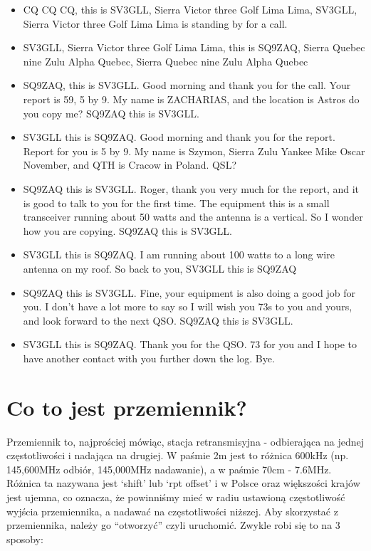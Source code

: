 \documentclass[a4paper,12pt]{article}
\begin{document}
\begin{itemize}
 \item CQ CQ CQ, this is SV3GLL, Sierra Victor three Golf Lima Lima, SV3GLL, Sierra Victor three Golf Lima Lima is standing by for a call.
 \item SV3GLL, Sierra Victor three Golf Lima Lima, this is SQ9ZAQ, Sierra Quebec nine Zulu Alpha Quebec, Sierra Quebec nine Zulu Alpha Quebec
 \item SQ9ZAQ, this is SV3GLL. Good morning and thank you for the call. Your report is 59, 5 by 9. My name is ZACHARIAS, and the location is Astros do you copy me? SQ9ZAQ this is SV3GLL.
 \item SV3GLL this is SQ9ZAQ. Good morning and thank you for the report. Report for you is 5 by 9. My name is Szymon, Sierra Zulu Yankee Mike Oscar November, and QTH is Cracow in Poland. QSL?
 \item SQ9ZAQ this is SV3GLL. Roger, thank you very much for the report, and it is good to talk to you for the first time. The equipment this is a small transceiver running about 50 watts and the antenna is a vertical. So I wonder how you are copying. SQ9ZAQ this is SV3GLL.
 \item SV3GLL this is SQ9ZAQ. I am running about 100 watts to a long wire antenna on my roof. So back to you, SV3GLL this is SQ9ZAQ
 \item SQ9ZAQ this is SV3GLL. Fine, your equipment is also doing a good job for you. I don't have a lot more to say so I will wish you 73s to you and yours, and look forward to the next QSO. SQ9ZAQ this is SV3GLL.
 \item SV3GLL this is SQ9ZAQ. Thank you for the QSO. 73 for you and I hope to have another contact with you further down the log. Bye.
\end{itemize}

\section{Co to jest przemiennik?}
Przemiennik to, najprościej mówiąc, stacja retransmisyjna - odbierająca na jednej częstotliwości i nadająca na drugiej. W paśmie 2m jest to różnica 600kHz (np. 145,600MHz odbiór, 145,000MHz nadawanie), a w paśmie 70cm - 7.6MHz. Różnica ta nazywana jest ‘shift’ lub ‘rpt offset’ i w Polsce oraz większości krajów jest ujemna, co oznacza, że powinniśmy mieć w radiu ustawioną częstotliwość wyjścia przemiennika, a nadawać na częstotliwości niższej. Aby skorzystać z przemiennika, należy go ``otworzyć'' czyli uruchomić. Zwykle robi się to na 3 sposoby:
\end{document}

